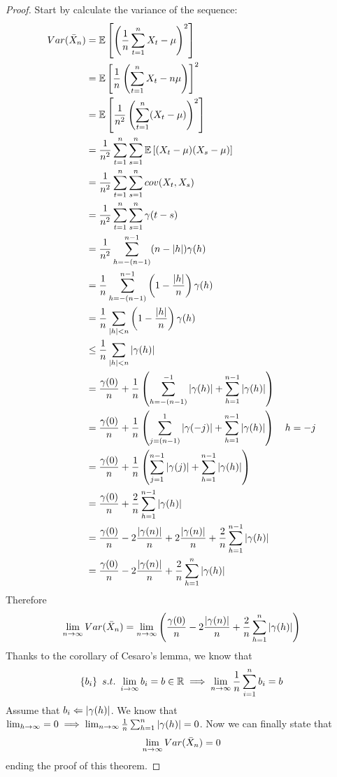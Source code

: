 \begin{proof}
    Start by calculate the variance of the sequence:
    \begin{equation*}
        \begin{split}
            Var(\mean{X}_n)&=\expect{\left(\frac{1}{n}\sum_{t=1}^nX_t-\mu\right)^2}\\
            &=\expect{\frac{1}{n}\left(\sum_{t=1}^nX_t-n\mu\right)}^2\\
            &=\expect{\frac{1}{n^2}\left(\sum_{t=1}^n(X_t-\mu)\right)^2}\\
            &=\frac{1}{n^2}\sum_{t=1}^n\sum_{s=1}^{n}\expect{(X_t-\mu)(X_s-\mu)}\\
            &=\frac{1}{n^2}\sum_{t=1}^n\sum_{s=1}^{n}cov(X_t,X_s)\\
            &=\frac{1}{n^2}\sum_{t=1}^n\sum_{s=1}^{n}\gamma(t-s)\\
            &=\frac{1}{n^2}\sum_{h=-(n-1)}^{n-1}(n-\abs{h})\gamma(h)\\
            &=\frac{1}{n}\sum_{h=-(n-1)}^{n-1}\left(1-\frac{\abs{h}}{n}\right)\gamma(h)\\
            &=\frac{1}{n}\sum_{\abs{h}<n}\left(1-\frac{\abs{h}}{n}\right)\gamma(h)\\
            &\le\frac{1}{n}\sum_{\abs{h}<n}\abs{\gamma(h)}\\
            &=\frac{\gamma(0)}{n}+\frac{1}{n}\left(\sum_{h=-(n-1)}^{-1}\abs{\gamma(h)}+\sum_{h=1}^{n-1}\abs{\gamma(h)}\right)\\
            &=\frac{\gamma(0)}{n}+\frac{1}{n}\left(\sum_{j=(n-1)}^{1}\abs{\gamma(-j)}+\sum_{h=1}^{n-1}\abs{\gamma(h)}\right)\ \ \ h=-j\\
            &=\frac{\gamma(0)}{n}+\frac{1}{n}\left(\sum_{j=1}^{n-1}\abs{\gamma(j)}+\sum_{h=1}^{n-1}\abs{\gamma(h)}\right)\\
            &=\frac{\gamma(0)}{n}+\frac{2}{n}\sum_{h=1}^{n-1}\abs{\gamma(h)}\\
            &=\frac{\gamma(0)}{n}-2\frac{\abs{\gamma(n)}}{n}+2\frac{\abs{\gamma(n)}}{n}+\frac{2}{n}\sum_{h=1}^{n-1}\abs{\gamma(h)}\\
            &=\frac{\gamma(0)}{n}-2\frac{\abs{\gamma(n)}}{n}+\frac{2}{n}\sum_{h=1}^{n}\abs{\gamma(h)}\\
        \end{split}
    \end{equation*}
    Therefore
    \[
        \lim_{n\to\infty}Var(\bar{X}_n)=\lim_{n\to\infty}\left(\frac{\gamma(0)}{n}-2\frac{\left|\gamma(n)\right|}{n}+\frac{2}{n}\sum_{h=1}^{n}\left|\gamma(h)\right|\right)
    \]
    Thanks to the corollary of Cesaro's lemma, we know that
    \[
        \set{b_i}\ s.t.\ \lim_{i\to\infty}b_i=b\in\R\implies\lim_{n\to\infty}\frac{1}{n}\sum_{i=1}^nb_i=b
    \]
    Assume that $b_i\Leftarrow\left|\gamma(h)\right|$. We know that $\lim_{h\to\infty}=0\implies\lim_{n\to\infty}\frac{1}{n}\sum_{h=1}^n\left|\gamma(h)\right|=0$. Now we can finally state that
    \[
        \lim_{n\to\infty}Var(\bar{X}_n)=0  
    \]
    ending the proof of this theorem.
\end{proof}

